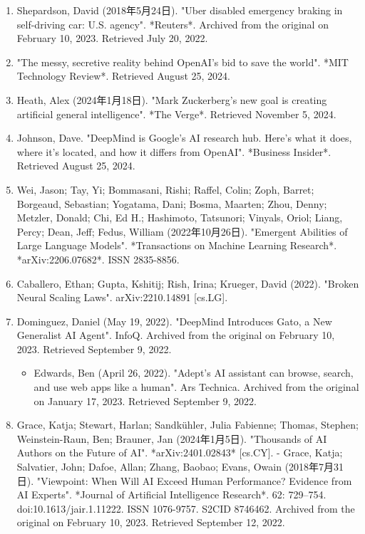 \begin{enumerate}
\item Shepardson, David (2018年5月24日). "Uber disabled emergency braking in self-driving car: U.S. agency". *Reuters*. Archived from the original on February 10, 2023. Retrieved July 20, 2022.
\item "The messy, secretive reality behind OpenAI's bid to save the world". *MIT Technology Review*. Retrieved August 25, 2024.
\item Heath, Alex (2024年1月18日). "Mark Zuckerberg's new goal is creating artificial general intelligence". *The Verge*. Retrieved November 5, 2024.
\item Johnson, Dave. "DeepMind is Google's AI research hub. Here's what it does, where it's located, and how it differs from OpenAI". *Business Insider*. Retrieved August 25, 2024.
\item Wei, Jason; Tay, Yi; Bommasani, Rishi; Raffel, Colin; Zoph, Barret; Borgeaud, Sebastian; Yogatama, Dani; Bosma, Maarten; Zhou, Denny; Metzler, Donald; Chi, Ed H.; Hashimoto, Tatsunori; Vinyals, Oriol; Liang, Percy; Dean, Jeff; Fedus, William (2022年10月26日). "Emergent Abilities of Large Language Models". *Transactions on Machine Learning Research*. *arXiv:2206.07682*. ISSN 2835-8856.
\item Caballero, Ethan; Gupta, Kshitij; Rish, Irina; Krueger, David (2022). "Broken Neural Scaling Laws". arXiv:2210.14891 [cs.LG].
\item Dominguez, Daniel (May 19, 2022). "DeepMind Introduces Gato, a New Generalist AI Agent". InfoQ. Archived from the original on February 10, 2023. Retrieved September 9, 2022.
\begin{itemize}
\item Edwards, Ben (April 26, 2022). "Adept's AI assistant can browse, search, and use web apps like a human". Ars Technica. Archived from the original on January 17, 2023. Retrieved September 9, 2022.
\end{itemize}
\item Grace, Katja; Stewart, Harlan; Sandkühler, Julia Fabienne; Thomas, Stephen; Weinstein-Raun, Ben; Brauner, Jan (2024年1月5日). "Thousands of AI Authors on the Future of AI". *arXiv:2401.02843* [cs.CY].
- Grace, Katja; Salvatier, John; Dafoe, Allan; Zhang, Baobao; Evans, Owain (2018年7月31日). "Viewpoint: When Will AI Exceed Human Performance? Evidence from AI Experts". *Journal of Artificial Intelligence Research*. 62: 729–754. doi:10.1613/jair.1.11222. ISSN 1076-9757. S2CID 8746462. Archived from the original on February 10, 2023. Retrieved September 12, 2022.

\end{enumerate}
